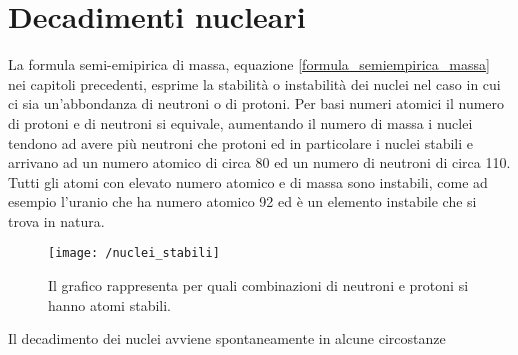 \section{Decadimenti nucleari}
La formula semi-emipirica di massa, equazione \ref{formula_semiempirica_massa} nei capitoli precedenti, esprime la stabilità o instabilità dei nuclei nel caso in cui ci sia un'abbondanza di neutroni o di protoni.
Per basi numeri atomici il numero di protoni e di neutroni si equivale, aumentando il numero di massa i nuclei tendono ad avere più neutroni che protoni ed in particolare i nuclei stabili e arrivano ad un numero atomico di circa 80 ed un numero di neutroni di circa 110.
Tutti gli atomi con elevato numero atomico e di massa sono instabili, come ad esempio l'uranio che ha numero atomico 92 ed è un elemento instabile che si trova in natura.
\begin{figure}[h]
\centering
\texttt{[image: /nuclei\_stabili]}
\caption{Il grafico rappresenta per quali combinazioni di neutroni e protoni si hanno atomi stabili.}
\end{figure}
Il decadimento dei nuclei avviene spontaneamente in alcune circostanze

